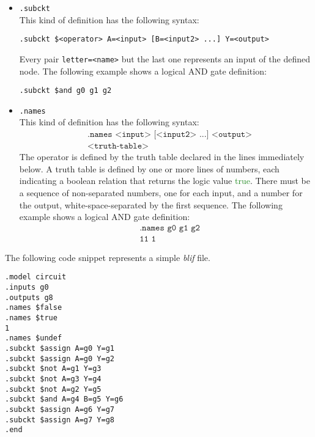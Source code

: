 \documentclass[]{usiinfbachelorproject}
\begin{document}
\begin{itemize}
    \item \texttt{.subckt}\label{it:gates}
        \vspace{0.2cm} \\
        This kind of definition has the following syntax:
        \begin{center}
            \texttt{.subckt \$<operator> A=<input> [B=<input2> ...] Y=<output>}
        \end{center}
        Every pair \texttt{letter=<name>} but the last one represents an input of the defined node. The following example shows a logical AND gate definition:
        \begin{center}
            \texttt{.subckt \$and g0 g1 g2}
        \end{center}
    \item \texttt{.names}
        \vspace{0.2cm} \\
        This kind of definition has the following syntax:
        \begin{align*}
            &\texttt{.names <input> [<input2> ...] <output>} \\
            &\texttt{<truth-table>}
        \end{align*}
        The operator is defined by the truth table declared in the lines immediately below. A truth table is defined by one or more lines of numbers, each indicating a boolean relation that returns the logic value \textcolor{ForestGreen}{true}. There must be a sequence of non-separated numbers, one for each input, and a number for the output, white-space-separated by the first sequence. The following example shows a logical AND gate definition:
        \begin{align*}
            &\texttt{.names g0 g1 g2} \\
            &\texttt{11 1}
        \end{align*}
\end{itemize}
The following code snippet represents a simple \textit{blif} file.
\begin{verbatim}
.model circuit
.inputs g0
.outputs g8
.names $false
.names $true
1
.names $undef
.subckt $assign A=g0 Y=g1
.subckt $assign A=g0 Y=g2
.subckt $not A=g1 Y=g3
.subckt $not A=g3 Y=g4
.subckt $not A=g2 Y=g5
.subckt $and A=g4 B=g5 Y=g6
.subckt $assign A=g6 Y=g7
.subckt $assign A=g7 Y=g8
.end
\end{verbatim}
\end{document}
